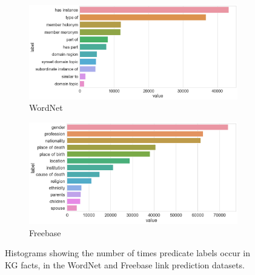 
\bigskip

\begin{figure}[H]
	\begin{subfigure}[b]{.5\linewidth}
   		\centering
    		\includegraphics[width=1.0\linewidth, height=0.6\linewidth]{Wordnet_Predicate_Counts}
		\captionsetup{justification=centering}
		\caption{WordNet}
	\end{subfigure}
	\begin{subfigure}[b]{.5\linewidth}
   		\centering
		\includegraphics[width=1.0\linewidth, height=0.6\linewidth]{Freebase_Predicate_Counts}
		\captionsetup{justification=centering}
		\caption{Freebase}
	\end{subfigure}
	\caption{Histograms showing the number of times predicate labels occur in KG facts, in the WordNet and Freebase link prediction datasets.}
\end{figure}


